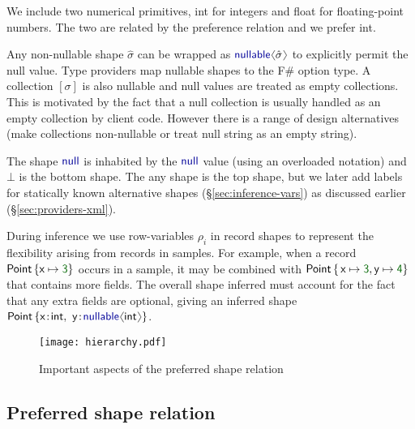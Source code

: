 \documentclass[10pt,nocopyrightspace]{sigplanconf}
\newcommand{\langl}{\begin{picture}(4.5,7)
\put(1.1,2.5){\rotatebox{60}{\line(1,0){5.5}}}
\put(1.1,2.5){\rotatebox{300}{\line(1,0){5.5}}}
\end{picture}}
\newcommand{\rangl}{\begin{picture}(4.5,7)
\put(.9,2.5){\rotatebox{120}{\line(1,0){5.5}}}
\put(.9,2.5){\rotatebox{240}{\line(1,0){5.5}}}
\end{picture}}
\newcommand{\kvd}[1]{\textnormal{\textcolor{kvdclr}{\sffamily #1}}}
\newcommand{\num}[1]{\textnormal{\textcolor{numclr}{\sffamily #1}}}
\newcommand{\ident}[1]{\textnormal{\sffamily #1}}
\begin{document}
We include two numerical primitives, \ident{int} for integers and \ident{float} for floating-point
numbers. The two are related by the preference relation and we prefer \ident{int}.

Any non-nullable shape $\hat{\sigma}$ can be wrapped as $\kvd{nullable}\langl\hat{\sigma}\rangl$ to
explicitly permit the \kvd{null} value. Type providers map \kvd{nullable} shapes to the F\# option
type. A collection $[\sigma]$ is also nullable and \kvd{null} values are treated as empty
collections. This is motivated by the fact that a \kvd{null} collection is usually
handled as an empty collection by client code. However there is a range of design alternatives (make collections
non-nullable or treat \kvd{null} \ident{string} as an empty string).

The shape $\kvd{null}$ is inhabited by the $\kvd{null}$ value (using an overloaded
notation) and $\bot$ is the bottom shape. The \kvd{any} shape is the top shape, but we later add
labels for statically known alternative shapes (\S\ref{sec:inference-vars}) as
discussed earlier (\S\ref{sec:providers-xml}).

During inference we use row-variables $\rho_i$ \cite{rows-cardelli} in record shapes to represent
the flexibility arising from records in samples. For example, when a
record $\ident{Point}\,\{ \ident{x} \mapsto \num{3} \}$ occurs in a sample,
it may be combined with $\ident{Point}\,\{\, \ident{x}\mapsto\num{3}, \ident{y}\mapsto\num{4} \}$ that contains more fields. The
overall shape inferred must account for the fact that any extra fields are optional,
giving an inferred shape $\ident{Point}\,\{ \ident{x}\!:\!\ident{int},~ \ident{y}\!:\!\kvd{nullable}\langl\ident{int}\rangl\}$.




\begin{figure}
\begin{center}
\texttt{[image: hierarchy.pdf]} \end{center}
\vspace{-0.5em}
\caption{Important aspects of the preferred shape relation}
\label{fig:subtyping-diagram}
\end{figure}



\subsection{Preferred shape relation}
\label{sec:inference-subtyping}
\end{document}
